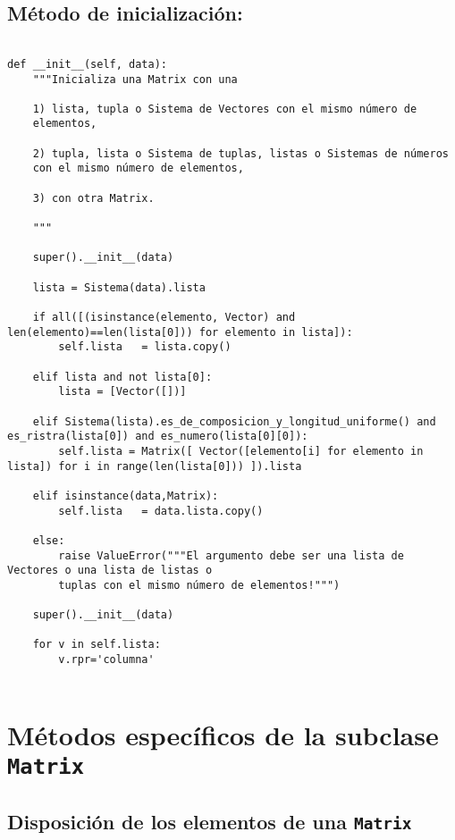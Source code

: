 \documentclass[11pt]{report}
\begin{document}
\subsection{Método de inicialización:}
\label{sec:org82663d0}

\begin{verbatim}

def __init__(self, data):
    """Inicializa una Matrix con una

    1) lista, tupla o Sistema de Vectores con el mismo número de
    elementos,
    
    2) tupla, lista o Sistema de tuplas, listas o Sistemas de números
    con el mismo número de elementos,
    
    3) con otra Matrix.

    """

    super().__init__(data)
    
    lista = Sistema(data).lista

    if all([(isinstance(elemento, Vector) and len(elemento)==len(lista[0])) for elemento in lista]):
        self.lista   = lista.copy()

    elif lista and not lista[0]:
        lista = [Vector([])]
        
    elif Sistema(lista).es_de_composicion_y_longitud_uniforme() and es_ristra(lista[0]) and es_numero(lista[0][0]):
        self.lista = Matrix([ Vector([elemento[i] for elemento in lista]) for i in range(len(lista[0])) ]).lista

    elif isinstance(data,Matrix):
        self.lista   = data.lista.copy()

    else: 
        raise ValueError("""El argumento debe ser una lista de Vectores o una lista de listas o
        tuplas con el mismo número de elementos!""")
    
    super().__init__(data)

    for v in self.lista:
        v.rpr='columna'
        
\end{verbatim}

\section{Métodos específicos de la subclase \texttt{Matrix}}
\label{sec:org77d577f}
\subsection{Disposición de los elementos de una \texttt{Matrix}}
\label{sec:orgd4ae643}
\end{document}
